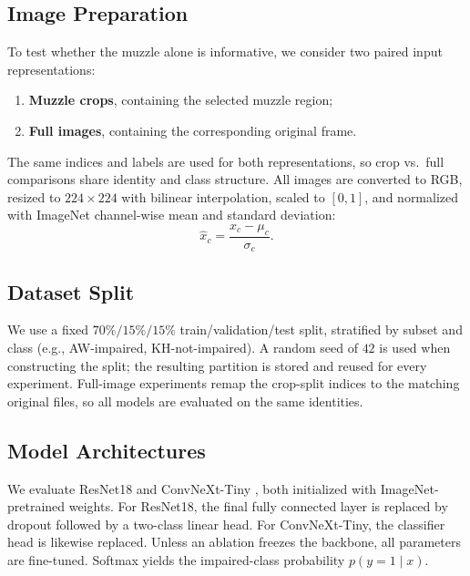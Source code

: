 \documentclass[sigconf]{acmart}
\begin{document}
\subsection{Image Preparation}
\label{subsec:image-preparation}

To test whether the muzzle alone is informative, we consider two paired input
representations:
\begin{enumerate}
    \item \textbf{Muzzle crops}, containing the selected muzzle region;
    \item \textbf{Full images}, containing the corresponding original frame.
\end{enumerate}
The same indices and labels are used for both representations, so crop vs.\
full comparisons share identity and class structure. All images are converted
to RGB, resized to $224\times224$ with bilinear interpolation, scaled to
$[0,1]$, and normalized with ImageNet channel-wise mean and standard deviation:
\begin{equation}
    \hat{x}_{c}
    =
    \frac{x_{c}-\mu_{c}}{\sigma_{c}}.
\end{equation}

\subsection{Dataset Split}
\label{subsec:dataset-split}

We use a fixed $70\%/15\%/15\%$ train/validation/test split, stratified by
subset and class (e.g., AW-impaired, KH-not-impaired). A random seed of $42$
is used when constructing the split; the resulting partition is stored and
reused for every experiment. Full-image experiments remap the crop-split
indices to the matching original files, so all models are evaluated on the
same identities.

\subsection{Model Architectures}
\label{subsec:model-architectures}

We evaluate ResNet18 \cite{He2016} and ConvNeXt-Tiny \cite{Liu2022}, both
initialized with ImageNet-pretrained weights. For ResNet18, the final fully
connected layer is replaced by dropout followed by a two-class linear head.
For ConvNeXt-Tiny, the classifier head is likewise replaced. Unless an
ablation freezes the backbone, all parameters are fine-tuned. Softmax yields
the impaired-class probability $p(y=1\mid x)$.
\end{document}
